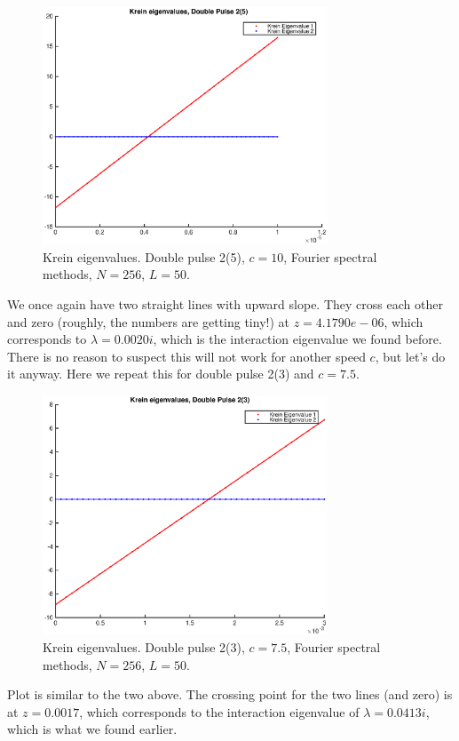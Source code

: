 \documentclass[12pt]{article}
\begin{document}
\begin{figure}[H]
	\includegraphics[width=8.5cm]{dp4kreineig1}
	\caption{Krein eigenvalues. Double pulse 2(5), $c = 10$, Fourier spectral methods, $N = 256$, $L = 50$. }
\end{figure}

We once again have two straight lines with upward slope. They cross each other and zero (roughly, the numbers are getting tiny!) at $z = 4.1790e-06$, which corresponds to $\lambda = 0.0020i$, which is the interaction eigenvalue we found before.\\

There is no reason to suspect this will not work for another speed $c$, but let's do it anyway. Here we repeat this for double pulse 2(3) and $c = 7.5$.

\begin{figure}[H]
	\includegraphics[width=8.5cm]{dp2_75kreineig1}
	\caption{Krein eigenvalues. Double pulse 2(3), $c = 7.5$, Fourier spectral methods, $N = 256$, $L = 50$. }
\end{figure}

Plot is similar to the two above. The crossing point for the two lines (and zero) is at $z = 0.0017$, which corresponds to the interaction eigenvalue of $\lambda = 0.0413i$, which is what we found earlier.\\
\end{document}
